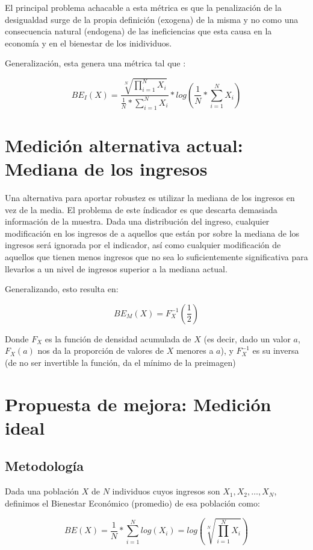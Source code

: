 El principal problema achacable a esta métrica es que la penalización de la desigualdad surge de la propia definición (exogena) de la misma y no como una consecuencia natural (endogena) de las ineficiencias que esta causa en la economía y en el bienestar de los inidividuos.

Generalización, esta genera una métrica tal que :

$$
    BE_I(X) = \frac{\sqrt[N]{\prod_{i=1}^NX_i}}{\frac{1}{N} * \sum_{i=1}^N X_i} * log(\frac{1}{N} * \sum_{i=1}^{N}X_i)
$$



\section{Medición alternativa actual: Mediana de los ingresos}

Una alternativa para aportar robustez es utilizar la mediana de los ingresos en vez de la media. El problema de este índicador es que descarta demasiada información de la muestra. Dada una distribución del ingreso, cualquier modificación en los ingresos de a aquellos que están por sobre la mediana de los ingresos será ignorada por el indicador, así como cualquier modificación de aquellos que tienen menos ingresos que no sea lo suficientemente significativa para llevarlos a un nivel de ingresos superior a la mediana actual.

Generalizando, esto resulta en:

$$
    BE_M(X) = F_X^{-1}(\frac{1}{2})
$$

Donde $F_X$ es la función de densidad acumulada de $X$ (es decir, dado un valor $a$, $F_X(a)$ nos da la proporción de valores de $X$ menores a $a$), y $F_X^{-1}$ es su inversa (de no ser invertible la función, da el mínimo de la preimagen)

\section{Propuesta de mejora: Medición ideal}

\subsection{Metodología}

Dada una población $X$ de $N$ individuos cuyos ingresos son $X_1, X_2, \dots, X_N$, definimos el Bienestar Económico (promedio) de esa población como:

$$
    BE(X) = \frac{1}{N} * \sum_{i=1}^N log(X_i) = log(\sqrt[N]{\prod_{i=1}^N X_i})
$$

